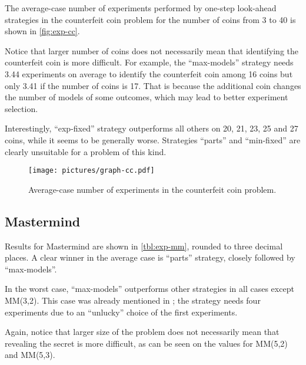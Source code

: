 The average-case number of experiments performed by one-step look-ahead
  strategies in the counterfeit coin problem
  for the number of coins from 3 to 40 is shown in \autoref{fig:exp-cc}.

Notice that larger number of coins does not necessarily mean that
  identifying the counterfeit coin is more difficult.
For example, the ``max-models'' strategy needs
  3.44 experiments on average to identify the counterfeit coin
  among 16 coins but only 3.41 if the number of coins is 17.
That is because the additional coin changes
  the number of models of some outcomes,
  which may lead to better experiment selection.

Interestingly, ``exp-fixed'' strategy outperforms all others
  on 20, 21, 23, 25 and 27 coins, while it seems to be
  generally worse.
Strategies ``parts'' and ``min-fixed'' are clearly unsuitable for
  a problem of this kind.

\begin{figure}[h]
\begin{center}
\texttt{[image: pictures/graph-cc.pdf]}
\caption{Average-case number of experiments in the counterfeit coin problem.}
\label{fig:exp-cc}
\end{center}
\end{figure}

\subsection{Mastermind}

Results for Mastermind are shown in \autoref{tbl:exp-mm},
  rounded to three decimal places.
A clear winner in the average case is ``parts'' strategy,
  closely followed by ``max-models''.

In the worst case, ``max-models'' outperforms other
  strategies in all cases except MM(3,2).
This case was already mentioned in ;
  the strategy needs four experiments due to an ``unlucky''
  choice of the first experiments.

Again, notice that larger size of the problem does not necessarily mean that
  revealing the secret is more difficult,
  as can be seen on the values for MM(5,2) and MM(5,3).

